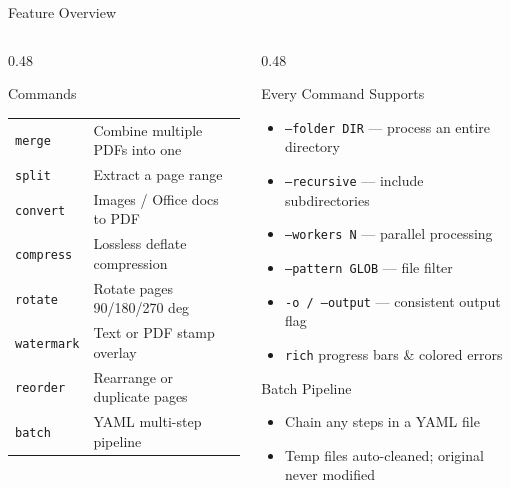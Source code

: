 \documentclass[aspectratio=169]{beamer}
\begin{document}
\begin{frame}{Feature Overview}
  \begin{columns}[T]
    \begin{column}{0.48\textwidth}
      \begin{block}{Commands}
        \renewcommand{\arraystretch}{1.25}
        \begin{tabular}{ll}
          \texttt{merge}     & Combine multiple PDFs into one \\
          \texttt{split}     & Extract a page range \\
          \texttt{convert}   & Images / Office docs to PDF \\
          \texttt{compress}  & Lossless deflate compression \\
          \texttt{rotate}    & Rotate pages 90/180/270 deg \\
          \texttt{watermark} & Text or PDF stamp overlay \\
          \texttt{reorder}   & Rearrange or duplicate pages \\
          \texttt{batch}     & YAML multi-step pipeline \\
        \end{tabular}
      \end{block}
    \end{column}
    \begin{column}{0.48\textwidth}
      \begin{block}{Every Command Supports}
        \begin{itemize}
          \item \texttt{--folder DIR} --- process an entire directory
          \item \texttt{--recursive} --- include subdirectories
          \item \texttt{--workers N} --- parallel processing
          \item \texttt{--pattern GLOB} --- file filter
          \item \texttt{-o / --output} --- consistent output flag
          \item \texttt{rich} progress bars \& colored errors
        \end{itemize}
      \end{block}
      \vspace{6pt}
      \begin{block}{Batch Pipeline}
        \begin{itemize}
          \item Chain any steps in a YAML file
          \item Temp files auto-cleaned; original never modified
        \end{itemize}
      \end{block}
    \end{column}
  \end{columns}
\end{frame}
\end{document}
